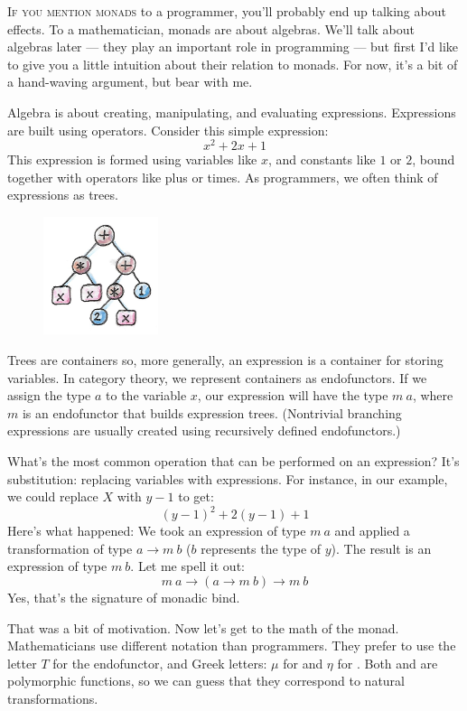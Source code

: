 
\lettrine[lhang=0.17]{I}{f you mention monads} to a programmer, you'll probably end up talking
about effects. To a mathematician, monads are about algebras. We'll talk
about algebras later --- they play an important role in programming ---
but first I'd like to give you a little intuition about their relation
to monads. For now, it's a bit of a hand-waving argument, but bear with
me.

Algebra is about creating, manipulating, and evaluating expressions.
Expressions are built using operators. Consider this simple expression:
\[x^2 + 2 x + 1\]
This expression is formed using variables like $x$, and constants
like $1$ or $2$, bound together with operators like plus or times. As
programmers, we often think of expressions as trees.

\begin{figure}[H]
  \centering
  \includegraphics[width=0.3\textwidth]{images/exptree.png}
\end{figure}

\noindent
Trees are containers so, more generally, an expression is a container
for storing variables. In category theory, we represent containers as
endofunctors. If we assign the type $a$ to the variable
$x$, our expression will have the type $m\ a$, where
$m$ is an endofunctor that builds expression trees. (Nontrivial
branching expressions are usually created using recursively defined
endofunctors.)

What's the most common operation that can be performed on an expression?
It's substitution: replacing variables with expressions. For instance,
in our example, we could replace $X$ with $y - 1$ to
get:
\[(y - 1)^2 + 2 (y - 1) + 1\]
Here's what happened: We took an expression of type $m\ a$ and
applied a transformation of type $a \to m\ b$
($b$ represents the type of $y$). The result is an
expression of type $m\ b$. Let me spell it out:
\[m\ a \to (a \to m\ b) \to m\ b\]
Yes, that's the signature of monadic bind.

That was a bit of motivation. Now let's get to the math of the monad.
Mathematicians use different notation than programmers. They prefer to
use the letter $T$ for the endofunctor, and Greek letters: $\mu$ for
 and $\eta$ for . Both  and
 are polymorphic functions, so we can guess that they
correspond to natural transformations.

